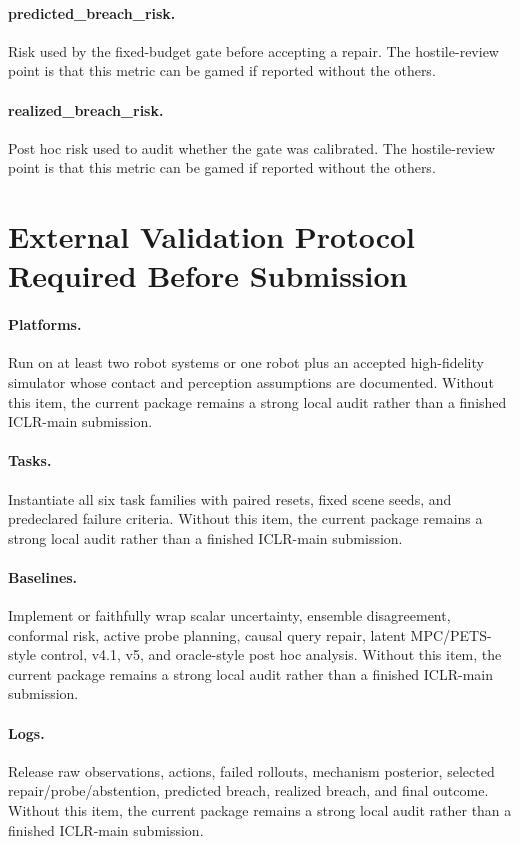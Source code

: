 \documentclass{article}
\begin{document}
\paragraph{predicted\_breach\_risk.} Risk used by the fixed-budget gate before accepting a repair. The hostile-review point is that this metric can be gamed if reported without the others.
\paragraph{realized\_breach\_risk.} Post hoc risk used to audit whether the gate was calibrated. The hostile-review point is that this metric can be gamed if reported without the others.
\clearpage
\section{External Validation Protocol Required Before Submission}
\paragraph{Platforms.} Run on at least two robot systems or one robot plus an accepted high-fidelity simulator whose contact and perception assumptions are documented. Without this item, the current package remains a strong local audit rather than a finished ICLR-main submission.
\paragraph{Tasks.} Instantiate all six task families with paired resets, fixed scene seeds, and predeclared failure criteria. Without this item, the current package remains a strong local audit rather than a finished ICLR-main submission.
\paragraph{Baselines.} Implement or faithfully wrap scalar uncertainty, ensemble disagreement, conformal risk, active probe planning, causal query repair, latent MPC/PETS-style control, v4.1, v5, and oracle-style post hoc analysis. Without this item, the current package remains a strong local audit rather than a finished ICLR-main submission.
\paragraph{Logs.} Release raw observations, actions, failed rollouts, mechanism posterior, selected repair/probe/abstention, predicted breach, realized breach, and final outcome. Without this item, the current package remains a strong local audit rather than a finished ICLR-main submission.
\end{document}
